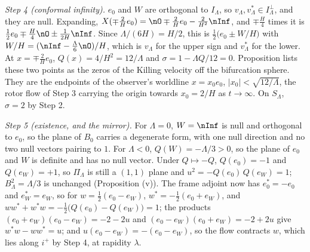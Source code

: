 \emph{Step 4 (conformal infinity).} $e_{0}$ and $W$ are orthogonal to $I_{\Lambda}$, so $v_{\Lambda}, v_{\Lambda}^{*} \in I_{\Lambda}^{\perp}$, and they are null. Expanding, $X(\mp\tfrac{2}{H}e_{0}) = \nO \mp \tfrac{2}{H}e_{0} - \tfrac{2}{H^{2}}\nInf$, and $\mp\tfrac{H}{4}$ times it is $\tfrac12 e_{0} \mp \tfrac{H}{4}\nO \pm \tfrac{1}{2H}\nInf$. Since $\Lambda/(6H) = H/2$, this is $\tfrac12\bigl(e_{0} \pm W/H\bigr)$ with $W/H = (\nInf - \tfrac{\Lambda}{6}\nO)/H$, which is $v_{\Lambda}$ for the upper sign and $v_{\Lambda}^{*}$ for the lower. At $x = \mp\tfrac{2}{H}e_{0}$, $Q(x) = 4/H^{2} = 12/\Lambda$ and $\sigma = 1 - \Lambda Q/12 = 0$. Proposition  lists these two points as the zeros of the Killing velocity off the bifurcation sphere. They are the endpoints of the observer's worldline $x = x_{0}e_{0}$, $|x_{0}| < \sqrt{12/\Lambda}$, the rotor flow of Step 3 carrying the origin towards $x_{0} = 2/H$ as $t \to \infty$. On $S_{\Lambda}$, $\sigma = 2$ by Step 2.

\emph{Step 5 (existence, and the mirror).} For $\Lambda = 0$, $W = \nInf$ is null and orthogonal to $e_{0}$, so the plane of $B_{0}$ carries a degenerate form, with one null direction and no two null vectors pairing to $1$. For $\Lambda < 0$, $Q(W) = -\Lambda/3 > 0$, so the plane of $e_{0}$ and $W$ is definite and has no null vector. Under $Q \mapsto -Q$, $Q(e_{0}) = -1$ and $Q(e_{W}) = +1$, so $\Pi_{\Lambda}$ is still a $(1,1)$ plane and $u^{2} = -Q(e_{0})\,Q(e_{W}) = 1$; $B_{\Lambda}^{2} = \Lambda/3$ is unchanged (Proposition (v)). The frame adjoint now has $e_{0}^{*} = -e_{0}$ and $e_{W}^{*} = e_{W}$, so for $w = \tfrac12(e_{0} - e_{W})$, $w^{*} = -\tfrac12(e_{0} + e_{W})$, and $ww^{*} + w^{*}w = -\tfrac12\bigl(Q(e_{0}) - Q(e_{W})\bigr) = 1$; the products $(e_{0} + e_{W})(e_{0} - e_{W}) = -2 - 2u$ and $(e_{0} - e_{W})(e_{0} + e_{W}) = -2 + 2u$ give $w^{*}w - ww^{*} = u$; and $u(e_{0} - e_{W}) = -(e_{0} - e_{W})$, so the flow contracts $w$, which lies along $i^{+}$ by Step 4, at rapidity $\lambda$.
